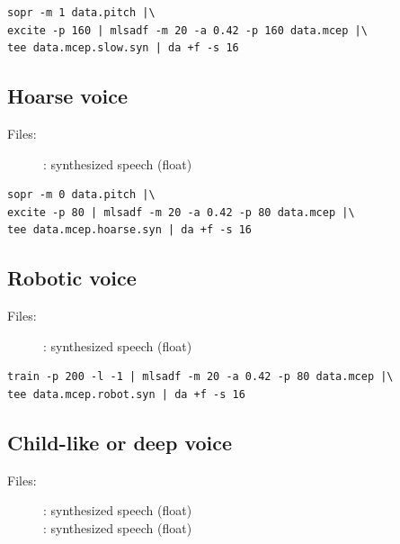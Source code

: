 \documentclass[a4paper,10pt]{article}
\begin{document}
\begin{verbatim}
sopr -m 1 data.pitch |\
excite -p 160 | mlsadf -m 20 -a 0.42 -p 160 data.mcep |\
tee data.mcep.slow.syn | da +f -s 16
\end{verbatim}

\subsection{Hoarse voice}

\begin{description}
\item[Files:]
  :
  synthesized speech (float)\\
\end{description}

\begin{verbatim}
sopr -m 0 data.pitch |\
excite -p 80 | mlsadf -m 20 -a 0.42 -p 80 data.mcep |\
tee data.mcep.hoarse.syn | da +f -s 16 
\end{verbatim}

\subsection{Robotic voice}

\begin{description}
\item[Files:]
  :
  synthesized speech (float)
\end{description}

\begin{verbatim}
train -p 200 -l -1 | mlsadf -m 20 -a 0.42 -p 80 data.mcep |\
tee data.mcep.robot.syn | da +f -s 16
\end{verbatim}

\subsection{Child-like or deep voice}

\begin{description}
\item[Files:]
  :
  synthesized speech (float)\\
  :
  synthesized speech (float)
\end{description}
\end{document}
